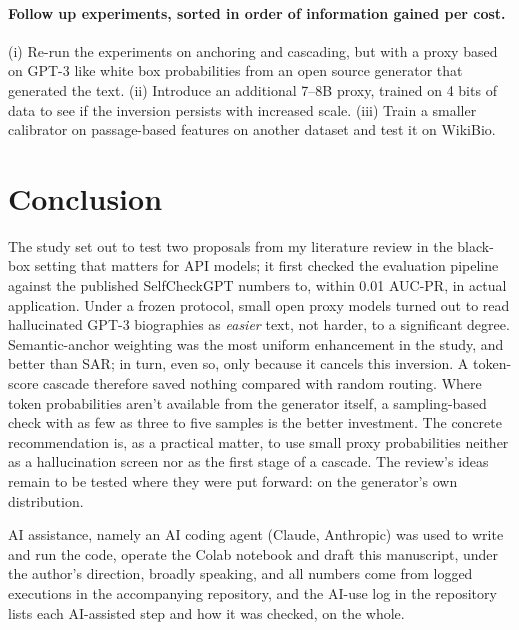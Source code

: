 \documentclass[acmsmall,screen,review,nonacm]{acmart}
\begin{document}
\paragraph{Follow up experiments, sorted in order of information gained per cost.} (i) Re-run the experiments on anchoring and cascading, but with a proxy based on GPT-3 like white box probabilities from an open source generator that generated the text. (ii) Introduce an additional 7--8B proxy, trained on 4 bits of data to see if the inversion persists with increased scale. (iii) Train a smaller calibrator on passage-based features on another dataset and test it on WikiBio.

\section{Conclusion}
The study set out to test two proposals from my literature review in the black-box setting that matters for API models; it first checked the evaluation pipeline against the published SelfCheckGPT numbers to, within 0.01 AUC-PR, in actual application. Under a frozen protocol, small open proxy models turned out to read hallucinated GPT-3 biographies as \emph{easier} text, not harder, to a significant degree. Semantic-anchor weighting was the most uniform enhancement in the study, and better than SAR; in turn, even so, only because it cancels this inversion. A token-score cascade therefore saved nothing compared with random routing. Where token probabilities aren't available from the generator itself, a sampling-based check with as few as three to five samples is the better investment. The concrete recommendation is, as a practical matter, to use small proxy probabilities neither as a hallucination screen nor as the first stage of a cascade. The review's ideas remain to be tested where they were put forward: on the generator's own distribution.

\begin{acks}
AI assistance, namely an AI coding agent (Claude, Anthropic) was used to write and run the code, operate the Colab notebook and draft this manuscript, under the author's direction, broadly speaking, and all numbers come from logged executions in the accompanying repository, and the AI-use log in the repository lists each AI-assisted step and how it was checked, on the whole.
\end{acks}



\end{document}
